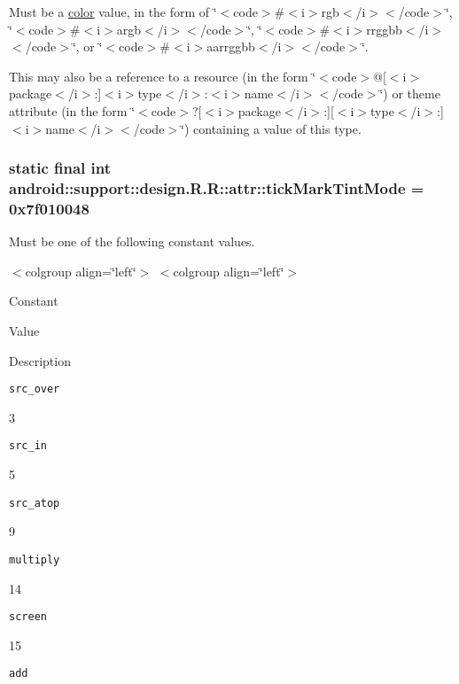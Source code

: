 Must be a \hyperlink{classandroid_1_1support_1_1design_1_1_r_1_1color}{color} value, in the form of \char`\"{}$<$code$>$\#$<$i$>$rgb$<$/i$>$$<$/code$>$\char`\"{}, \char`\"{}$<$code$>$\#$<$i$>$argb$<$/i$>$$<$/code$>$\char`\"{}, \char`\"{}$<$code$>$\#$<$i$>$rrggbb$<$/i$>$$<$/code$>$\char`\"{}, or \char`\"{}$<$code$>$\#$<$i$>$aarrggbb$<$/i$>$$<$/code$>$\char`\"{}. 

This may also be a reference to a resource (in the form \char`\"{}$<$code$>$@\mbox{[}$<$i$>$package$<$/i$>$:\mbox{]}$<$i$>$type$<$/i$>$:$<$i$>$name$<$/i$>$$<$/code$>$\char`\"{}) or theme attribute (in the form \char`\"{}$<$code$>$?\mbox{[}$<$i$>$package$<$/i$>$:\mbox{]}\mbox{[}$<$i$>$type$<$/i$>$:\mbox{]}$<$i$>$name$<$/i$>$$<$/code$>$\char`\"{}) containing a value of this type. \hypertarget{classandroid_1_1support_1_1design_1_1_r_1_1attr_21ab986fb507885042e701d0ce3ba58e}{
\subsubsection[{tickMarkTintMode}]{\setlength{\rightskip}{0pt plus 5cm}static final int android::support::design.R.R::attr::tickMarkTintMode = 0x7f010048}}
\label{classandroid_1_1support_1_1design_1_1_r_1_1attr_21ab986fb507885042e701d0ce3ba58e}


Must be one of the following constant values. \begin{TabularC}{0}
\hline
\end{TabularC}
$<$colgroup align=\char`\"{}left\char`\"{}$>$ $<$colgroup align=\char`\"{}left\char`\"{}$>$ 

Constant

Value

Description 

{\tt src\_\-over}

3

{\tt src\_\-in}

5

{\tt src\_\-atop}

9

{\tt multiply}

14

{\tt screen}

15

{\tt add}

